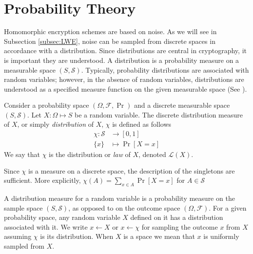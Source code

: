 \chapter{Probability Theory}
Homomorphic encryption schemes are based on noise. As we will see in Subsection \ref{subsec:LWE}, noise can be sampled from discrete spaces in accordance with a distribution. Since distributions are central in cryptography, it is important they are understood. A distribution is a probability measure on a measurable space $(S, \mathcal{S})$. Typically, probability distributions are associated with random variables; however, in the absence of random variables, distributions are understood as a specified measure function on the given measurable space (See \cite[pp. 83]{kallenberg-probability}).
\begin{definition}
Consider a probability space $(\Omega, \mathcal{F}, \operatorname{Pr})$ and a discrete measurable space $(S,\mathcal{S})$. Let $X \colon \Omega \mapsto S$ be a random variable. The discrete distribution measure of $X$, or simply \emph{distribution} of $X$, $\chi$ is defined as follows
\begin{equation*}
\begin{aligned}
    \chi \colon \mathcal{S} &\to [0,1]\\
    \{x\} &\mapsto \operatorname{Pr}[X = x]
\end{aligned}
\end{equation*}
We say that $\chi$ is the distribution or \emph{law} of $X$, denoted $\mathcal{L}(X)$. 
\end{definition}
\begin{remark}
    Since $\chi$ is a measure on a discrete space, the description of the singletons are sufficient. More explicitly, $\chi(A) = \sum_{x \in A} \operatorname{Pr}[X = x]$ for $A \in \mathcal{S}$
\end{remark}
A distribution measure for a random variable is a probability measure on the sample space $(S,\mathcal{S})$, as opposed to on the outcome space $(\Omega, \mathcal{F})$. For a given probability space, any random variable $X$ defined on it has a distribution associated with it. We write $x \leftarrow X$ or $x \leftarrow \chi$ for sampling the outcome $x$ from $X$ assuming $\chi$ is its distribution. When $X$ is a space we mean that $x$ is uniformly sampled from $X$.

